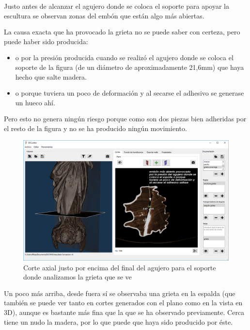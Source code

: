 Justo antes de alcanzar el agujero donde se coloca el soporte para apoyar la escultura se observan zonas del embón que están algo más abiertas. 

La causa exacta que ha provocado la grieta no se puede saber con certeza, pero puede haber sido producida:

\begin{itemize}
	\item o por la presión producida cuando se realizó el agujero donde se coloca el soporte de la figura (de un diámetro de aproximadamente 21,6mm) que haya hecho que salte madera.
	\item o porque tuviera un poco de deformación y al secarse el adhesivo se generase un hueco ahí.
\end{itemize}

Pero esto no genera ningún riesgo porque como son dos piezas bien adheridas por el resto de la figura y no se ha producido ningún movimiento.

\begin{figure}[H]
	\centering
	\includegraphics[width=12.5cm]{imagenes/resultados/documentacion/inmaculada-concepcion/grieta-zona-baja}
	\caption{Corte axial justo por encima del final del agujero para el soporte donde analizamos la grieta que se ve}
	\label{fig:resultados/documentacion/inmaculada-concepcion/grieta-zona-baja}
\end{figure}

Un poco más arriba, desde fuera sí se observaba una grieta en la espalda (que también se puede ver tanto en cortes generados con el plano como en la vista en 3D), aunque es bastante más fina que la que se ha observado previamente. Cerca tiene un nudo la madera, por lo que puede que haya sido producido por éste.

